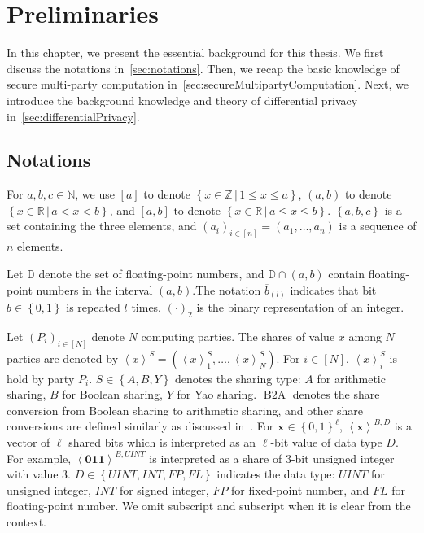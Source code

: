 \chapter{Preliminaries}
\label{cha:prelim}

In this chapter, we present the essential background for this thesis. We first discuss the notations in~\autoref{sec:notations}. Then, we recap the basic knowledge of secure multi-party computation in~\autoref{sec:secureMultipartyComputation}. Next, we introduce the background knowledge and theory of differential privacy in~\autoref{sec:differentialPrivacy}.

\section{Notations}
\label{sec:notations}


For $a,b,c \in \mathbb{N} $, we use $\left[a\right] $ to denote $\left\{x\in \mathbb{Z} \,|\, 1 \leq x \leq a\right\} $, $\left(a,b\right) $ to denote $\left\{x\in \mathbb{R} \, | \, a<x< b\right\} $, and $\left[a,b\right] $ to denote $\left\{x\in \mathbb{R} \, | \,a\leq x\leq b\right\} $. $\left\{a,b,c\right\} $ is a set containing the three elements, and $\left(a_i\right)_{i \in \left[ n\right]}=\left(a_1,\ldots,a_n\right) $ is a sequence of $n$ elements.

Let $\mathbb{D}$ denote the set of floating-point numbers, and $\mathbb{D} \cap \left(a,b\right) $ contain floating-point numbers in the interval $\left(a,b\right)$.The notation $\overline{b}_{\left(l\right) }$ indicates that bit $b\in \left\{0,1\right\} $ is repeated $l$ times. $\left(\cdot\right)_2 $ is the binary representation of an integer.

Let $\left(P_i\right)_{i\in \left[N\right] } $ denote $N$ computing parties. The shares of value $x$ among $N$ parties are denoted by $\left\langle x\right\rangle ^S=\left(\left\langle x\right\rangle_1^S ,\ldots, \left\langle x\right\rangle_N^S\right) $.
For $i\in \left[N\right] $, $\left\langle x\right\rangle _i^S$ is hold by party $P_i$. $S \in \left\{A,B,Y\right\} $ denotes the sharing type: $A$ for arithmetic sharing, $B$ for Boolean sharing, $Y$ for Yao sharing. $\operatorname{B2A}$ denotes the share conversion from Boolean sharing to arithmetic sharing, and other share conversions are defined similarly as discussed in~\cite{DSZ15}.
For $\boldsymbol{x}\in \left\{0,1\right\}^{\ell} $, $\left\langle \boldsymbol{x}\right\rangle^{B, D} $ is a vector of $\ell$ shared bits which is interpreted as an $\ell$-bit value of data type $D$. For example, $\left\langle \boldsymbol{011}\right\rangle^{B, UINT} $ is interpreted as a share of $3$-bit unsigned integer with value $3$.
$D \in \left\{UINT,INT,FP,FL\right\} $ indicates the data type: $UINT$ for unsigned integer, $INT$ for signed integer, $FP$ for fixed-point number, and $FL$ for floating-point number. We omit subscript and subscript when it is clear from the context.

